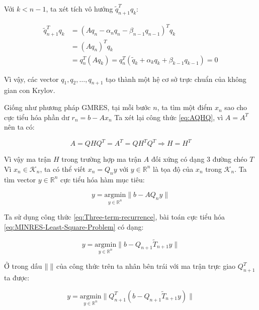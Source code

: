 \documentclass[14pt, a4paper]{article}
\numberwithin{equation}{section}
\numberwithin{algorithm}{section}
\numberwithin{figure}{section}
\numberwithin{dl}{section}
\numberwithin{md}{section}
\numberwithin{bd}{section}
\numberwithin{dn}{section}
\begin{document}
Với $k < n-1$, ta xét tích vô hướng $\tilde{q}_{n+1}^T q_k$:

\begin{equation}
    \begin{aligned}
        \tilde{q}_{n+1}^T q_k &= (A q_n - \alpha_n q_n - \beta_{n-1} q_{n-1})^T q_k \\
        &= (Aq_n)^T q_k \\
        &= q_n^T (Aq_k)=q_n^T (\tilde{q}_k + \alpha_k q_k + \beta_{k-1} q_{k-1})=0
    \end{aligned}
\end{equation}

Vì vậy, các vector $q_1, q_2, \dots, q_{n+1}$ tạo thành một hệ cơ sở trực chuẩn của không gian con Krylov.

Giống như phương pháp GMRES, tại mỗi bước $n$, ta tìm một điểm $x_n$ sao cho cực tiểu hóa phần dư $r_n=b - Ax_n$
Ta xét lại công thức \ref{eq:AQHQ}, vì $A = A^T$ nên ta có:

\begin{equation}
    A = QHQ^T = A^T = QH^TQ^T \Rightarrow H = H^T
\end{equation}

Vì vậy ma trận $H$ trong trường hợp ma trận $A$ đối xứng có dạng 3 đường chéo $T$
Vì $x_n \in \mathcal{K}_n$, ta có thể viết $x_n = Q_n y$ với $y \in \mathbb{R}^n$ là tọa độ của $x_n$ trong $\mathcal{K}_n$. Ta tìm vector $y \in \mathbb{R}^n$ cực tiểu hóa hàm mục tiêu:

\begin{equation} \label{eq:MINRES-Least-Square-Problem}
    y = \underset{y \in \mathbb{R}^n}{\mathrm{argmin}} \lVert b - AQ_n y \rVert
\end{equation}

Ta sử dụng công thức \ref{eq:Three-term-recurrence}, bài toán cực tiểu hóa \ref{eq:MINRES-Least-Square-Problem} có dạng:

\begin{equation}
    y = \underset{y \in \mathbb{R}^n}{\mathrm{argmin}} \lVert b - Q_{n+1} \widetilde{T}_{n+1} y \rVert
\end{equation}

Ở trong dấu $\lVert \thickspace \rVert$ của công thức trên ta nhân bên trái với ma trận trực giao $Q_{n+1}^T$ ta được:

\begin{equation}
    y = \underset{y \in \mathbb{R}^n}{\mathrm{argmin}} \lVert Q_{n+1}^T(b - Q_{n+1} \widetilde{T}_{n+1} y) \rVert
\end{equation}
\end{document}
